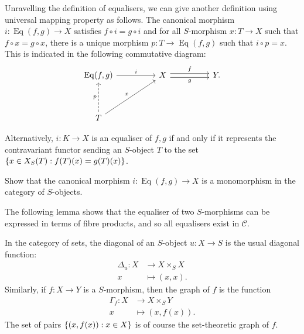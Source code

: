 \documentclass[12pt]{book}
\theoremstyle{definition}
\DeclarePairedDelimiter{\Set}{\lbrace}{\rbrace}
\newcommand{\Eqlsr}{\operatorname{Eq}}
\begin{document}
	Unravelling the definition of equalisers, we can give another definition using universal mapping property as follows. The canonical morphism $i \colon \Eqlsr(f, g) \to X$ satisfies $f\circ i = g \circ i$ and for all $S$-morphism $x \colon T \to X$ such that $f \circ x = g \circ x$, there is a unique morphism $p \colon T \to \Eqlsr(f, g)$ such that $i \circ p = x$. This is indicated in the following commutative diagram:
	\[\begin{tikzcd}
		{\Eqlsr(f,g)} && X && {Y.} \\
		\\
		T
		\arrow["i", from=1-1, to=1-3]
		\arrow["f", shift left, from=1-3, to=1-5]
		\arrow["g"', shift right, from=1-3, to=1-5]
		\arrow["p", dashed, from=3-1, to=1-1]
		\arrow["x", from=3-1, to=1-3]
	\end{tikzcd}\]
	
	Alternatively, $i \colon K \to X$ is an equaliser of $f, g$ if and only if it represents the contravariant functor sending an $S$-object $T$ to the set $\Set{x \in X_S(T) : f(T)(x) = g(T)(x)}$.
	
	\begin{exercise}
		Show that the canonical morphism $i \colon \Eqlsr(f, g) \to X$ is a monomorphism in the category of $S$-objects.
	\end{exercise}
	
	The following lemma shows that the equaliser of two $S$-morphisms can be expressed in terms of fibre products, and so all equalisers exist in $\mathcal{C}$.
	
	\begin{lemma}
		
	\end{lemma}
	
	\begin{example}
		In the category of sets, the diagonal of an $S$-object $u \colon X \to S$ is the usual diagonal function:
		\begin{align*}
			\Delta_u \colon X & \to X \times_S X \\
			x & \mapsto (x, x).
		\end{align*}
		Similarly, if $f \colon X \to Y$ is a $S$-morphism, then the graph of $f$ is the function
		\begin{align*}
			\Gamma_f \colon X & \to X \times_S Y \\
			x & \mapsto (x, f(x)).
		\end{align*}
		The set of pairs $\Set{(x, f(x)) : x \in X}$ is of course the set-theoretic graph of $f$.
	\end{example}
	
\end{document}
